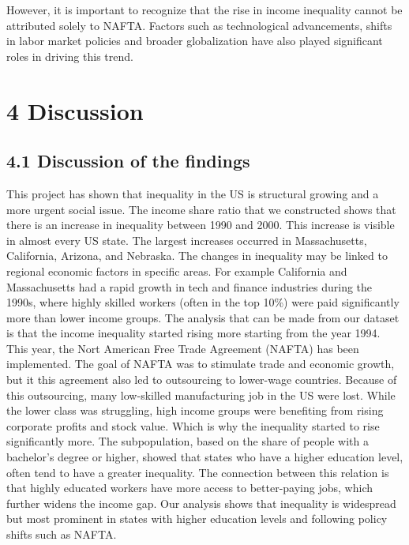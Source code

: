 \documentclass[
]{article}
\begin{document}
However, it is important to recognize that the rise in income inequality
cannot be attributed solely to NAFTA. Factors such as technological
advancements, shifts in labor market policies and broader globalization
have also played significant roles in driving this trend.

\section{4 Discussion}\label{discussion}

\subsection{4.1 Discussion of the
findings}\label{discussion-of-the-findings}

This project has shown that inequality in the US is structural growing
and a more urgent social issue. The income share ratio that we
constructed shows that there is an increase in inequality between 1990
and 2000. This increase is visible in almost every US state. The largest
increases occurred in Massachusetts, California, Arizona, and Nebraska.
The changes in inequality may be linked to regional economic factors in
specific areas. For example California and Massachusetts had a rapid
growth in tech and finance industries during the 1990s, where highly
skilled workers (often in the top 10\%) were paid significantly more
than lower income groups. The analysis that can be made from our dataset
is that the income inequality started rising more starting from the year
1994. This year, the Nort American Free Trade Agreement (NAFTA) has been
implemented. The goal of NAFTA was to stimulate trade and economic
growth, but it this agreement also led to outsourcing to lower-wage
countries. Because of this outsourcing, many low-skilled manufacturing
job in the US were lost. While the lower class was struggling, high
income groups were benefiting from rising corporate profits and stock
value. Which is why the inequality started to rise significantly more.
The subpopulation, based on the share of people with a bachelor's degree
or higher, showed that states who have a higher education level, often
tend to have a greater inequality. The connection between this relation
is that highly educated workers have more access to better-paying jobs,
which further widens the income gap. Our analysis shows that inequality
is widespread but most prominent in states with higher education levels
and following policy shifts such as NAFTA.
\end{document}
